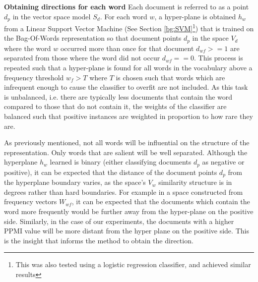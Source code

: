 
\noindent \textbf{Obtaining directions for each word} Each document is referred to as a point $d_p $ in the vector space model $S_{d}$. For each word $w$, a hyper-plane is obtained $h_w $ from a Linear Support Vector Machine (See Section \ref{bg:SVM}\footnote{This was also tested using a logistic regression classifier, and achieved similar results}) that is trained on the Bag-Of-Words representation so that document points $d_p $ in the space $V_d$  where the word $w $ occurred more than once  for that document $d_{wf} >= 1$ are separated from those where the word did not occur $d_{wf} == 0$. This process is repeated such that a hyper-plane is found for all words in the vocabulary above a frequency threshold $w_f > T$ where $T$ is chosen such that words which are infrequent enough to cause the classifier to overfit are not included. As this task is unbalanced, i.e. there are typically less documents that contain the word compared to those that do not contain it, the weights of the classifier are balanced such that positive instances are weighted in proportion to how rare they are. 

As previously mentioned, not all words will be influential on the structure of the representation. Only words that are salient will be well separated. Although the hyperplane $h_w$ learned is binary (either classifying documents $d_p$ as negative or positive), it can  be expected that the distance of the document points $d_p$ from the hyperplane boundary varies, as the space's $V_w$ similarity structure is in degrees rather than hard boundaries. For example in a space constructed from frequency vectors $W_{wf}$, it can be expected that the documents which contain the word more frequently would be further away from the hyper-plane on the positive side. Similarly, in the case of our experiments, the documents with a higher PPMI value will be more distant from the hyper plane on the positive side. This is the insight that informs the method to obtain the direction. 

